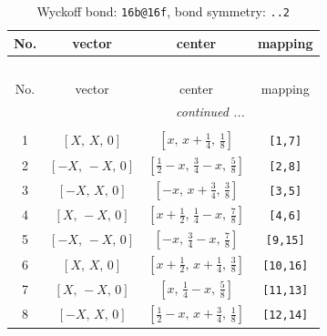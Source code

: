 \documentclass[fleqn,8pt]{jsarticle}
\begin{document}
\begin{longtable}{cccc}
\caption{Wyckoff bond: {\tt 16b@16f}, bond symmetry: {\tt ..2}}
 \\
 \hline \hline
No. & vector & center & mapping \\ \hline \endfirsthead

\multicolumn{3}{l}{\tablename\ \thetable{}} \\
 \hline \hline
No. & vector & center & mapping \\ \hline \endhead

 \hline \hline
\multicolumn{3}{r}{\footnotesize\it continued ...} \\ \endfoot

 \hline \hline
\multicolumn{3}{r}{} \\ \endlastfoot

1 & $\left[ X,\, X,\, 0 \right]$ & $\left[ x,\, x + \frac{1}{4},\, \frac{1}{8} \right]$ & {\tt [1,7]} \\ \hline
2 & $\left[ - X,\, - X,\, 0 \right]$ & $\left[ \frac{1}{2} - x,\, \frac{3}{4} - x,\, \frac{5}{8} \right]$ & {\tt [2,8]} \\ \hline
3 & $\left[ - X,\, X,\, 0 \right]$ & $\left[ - x,\, x + \frac{3}{4},\, \frac{3}{8} \right]$ & {\tt [3,5]} \\ \hline
4 & $\left[ X,\, - X,\, 0 \right]$ & $\left[ x + \frac{1}{2},\, \frac{1}{4} - x,\, \frac{7}{8} \right]$ & {\tt [4,6]} \\ \hline
5 & $\left[ - X,\, - X,\, 0 \right]$ & $\left[ - x,\, \frac{3}{4} - x,\, \frac{7}{8} \right]$ & {\tt [9,15]} \\ \hline
6 & $\left[ X,\, X,\, 0 \right]$ & $\left[ x + \frac{1}{2},\, x + \frac{1}{4},\, \frac{3}{8} \right]$ & {\tt [10,16]} \\ \hline
7 & $\left[ X,\, - X,\, 0 \right]$ & $\left[ x,\, \frac{1}{4} - x,\, \frac{5}{8} \right]$ & {\tt [11,13]} \\ \hline
8 & $\left[ - X,\, X,\, 0 \right]$ & $\left[ \frac{1}{2} - x,\, x + \frac{3}{4},\, \frac{1}{8} \right]$ & {\tt [12,14]} \\
\end{longtable}
\renewcommand{\arraystretch}{1.2}
\end{document}
